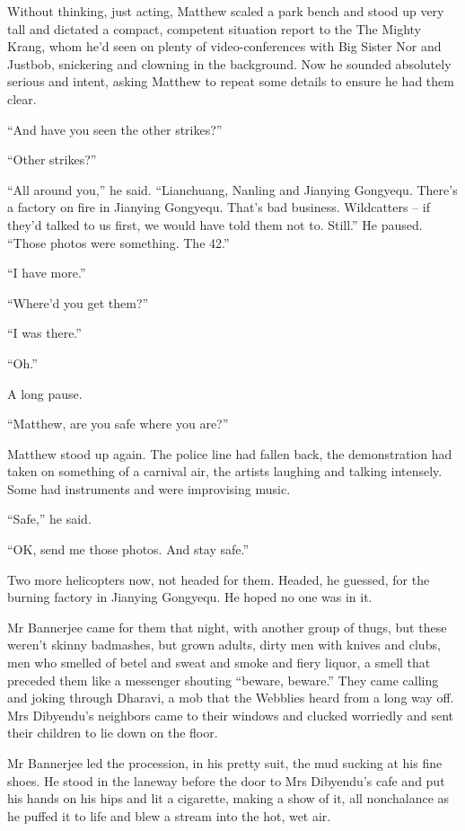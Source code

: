 Without thinking, just acting, Matthew scaled a park bench and
stood up very tall and dictated a compact, competent situation
report to the The Mighty Krang, whom he'd seen on plenty of
video-conferences with Big Sister Nor and Justbob, snickering and
clowning in the background. Now he sounded absolutely serious and
intent, asking Matthew to repeat some details to ensure he had them
clear.

``And have you seen the other strikes?''

``Other strikes?''

``All around you,'' he said. ``Lianchuang, Nanling and Jianying
Gongyequ. There's a factory on fire in Jianying Gongyequ. That's
bad business. Wildcatters -- if they'd talked to us first, we would
have told them not to. Still.'' He paused. ``Those photos were
something. The 42.''

``I have more.''

``Where'd you get them?''

``I was there.''

``Oh.''

A long pause.

``Matthew, are you safe where you are?''

Matthew stood up again. The police line had fallen back, the
demonstration had taken on something of a carnival air, the artists
laughing and talking intensely. Some had instruments and were
improvising music.

``Safe,'' he said.

``OK, send me those photos. And stay safe.''

Two more helicopters now, not headed for them. Headed, he guessed,
for the burning factory in Jianying Gongyequ. He hoped no one was
in it.

\tb

Mr Bannerjee came for them that night, with another group of thugs,
but these weren't skinny badmashes, but grown adults, dirty men
with knives and clubs, men who smelled of betel and sweat and smoke
and fiery liquor, a smell that preceded them like a messenger
shouting ``beware, beware.'' They came calling and joking through
Dharavi, a mob that the Webblies heard from a long way off. Mrs
Dibyendu's neighbors came to their windows and clucked worriedly
and sent their children to lie down on the floor.

Mr Bannerjee led the procession, in his pretty suit, the mud
sucking at his fine shoes. He stood in the laneway before the door
to Mrs Dibyendu's cafe and put his hands on his hips and lit a
cigarette, making a show of it, all nonchalance as he puffed it to
life and blew a stream into the hot, wet air.

